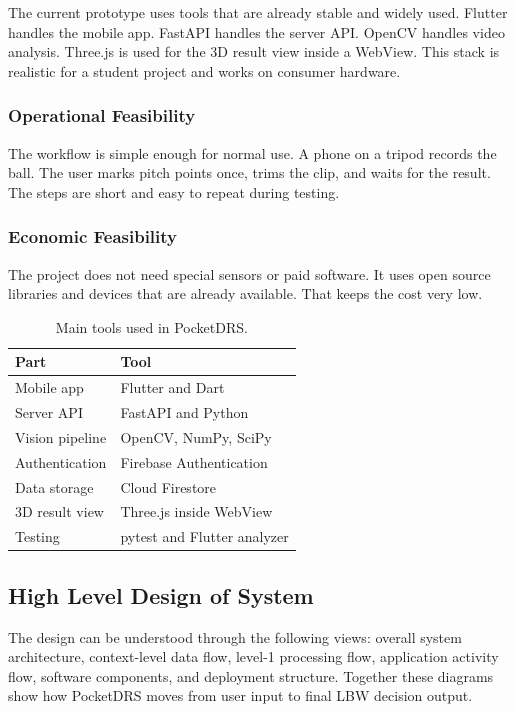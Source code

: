 \documentclass[12pt,a4paper]{article}
\begin{document}
The current prototype uses tools that are already stable and widely used. Flutter handles the mobile app. FastAPI handles the server API. OpenCV handles video analysis. Three.js is used for the 3D result view inside a WebView. This stack is realistic for a student project and works on consumer hardware.

\subsubsection{Operational Feasibility}

The workflow is simple enough for normal use. A phone on a tripod records the ball. The user marks pitch points once, trims the clip, and waits for the result. The steps are short and easy to repeat during testing.

\subsubsection{Economic Feasibility}

The project does not need special sensors or paid software. It uses open source libraries and devices that are already available. That keeps the cost very low.

\begin{table}[htbp]
\centering
\caption{Main tools used in PocketDRS.}
\label{tab:stack}
\begin{tabularx}{\textwidth}{@{}lX@{}}
\toprule
\textbf{Part} & \textbf{Tool} \\
\midrule
Mobile app & Flutter and Dart \\
Server API & FastAPI and Python \\
Vision pipeline & OpenCV, NumPy, SciPy \\
Authentication & Firebase Authentication \\
Data storage & Cloud Firestore \\
3D result view & Three.js inside WebView \\
Testing & pytest and Flutter analyzer \\
\bottomrule
\end{tabularx}
\end{table}

\subsection{High Level Design of System}

The design can be understood through the following views: overall system architecture, context-level data flow, level-1 processing flow, application activity flow, software components, and deployment structure. Together these diagrams show how PocketDRS moves from user input to final LBW decision output.
\end{document}
